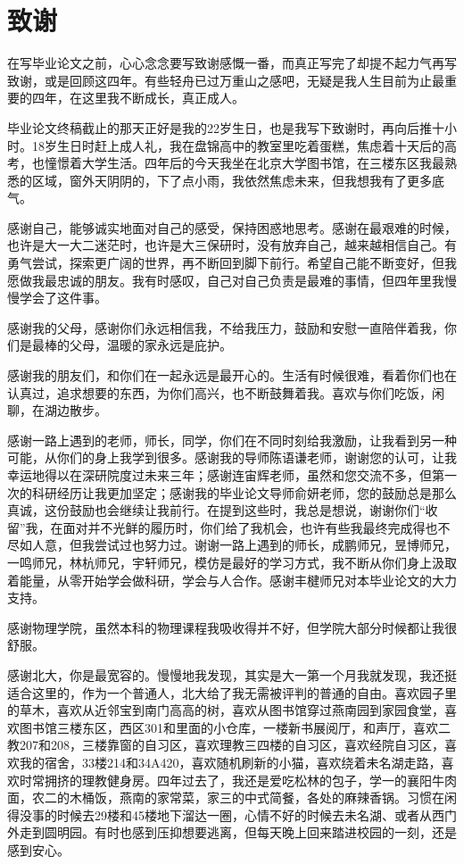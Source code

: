 \chapter{致谢}
在写毕业论文之前，心心念念要写致谢感慨一番，而真正写完了却提不起力气再写致谢，或是回顾这四年。有些轻舟已过万重山之感吧，无疑是我人生目前为止最重要的四年，在这里我不断成长，真正成人。

毕业论文终稿截止的那天正好是我的22岁生日，也是我写下致谢时，再向后推十小时。18岁生日时赶上成人礼，我在盘锦高中的教室里吃着蛋糕，焦虑着十天后的高考，也憧憬着大学生活。四年后的今天我坐在北京大学图书馆，在三楼东区我最熟悉的区域，窗外天阴阴的，下了点小雨，我依然焦虑未来，但我想我有了更多底气。

感谢自己，能够诚实地面对自己的感受，保持困惑地思考。感谢在最艰难的时候，也许是大一大二迷茫时，也许是大三保研时，没有放弃自己，越来越相信自己。有勇气尝试，探索更广阔的世界，再不断回到脚下前行。希望自己能不断变好，但我愿做我最忠诚的朋友。我有时感叹，自己对自己负责是最难的事情，但四年里我慢慢学会了这件事。

感谢我的父母，感谢你们永远相信我，不给我压力，鼓励和安慰一直陪伴着我，你们是最棒的父母，温暖的家永远是庇护。

感谢我的朋友们，和你们在一起永远是最开心的。生活有时候很难，看着你们也在认真过，追求想要的东西，为你们高兴，也不断鼓舞着我。喜欢与你们吃饭，闲聊，在湖边散步。

感谢一路上遇到的老师，师长，同学，你们在不同时刻给我激励，让我看到另一种可能，从你们的身上我学到很多。感谢我的导师陈语谦老师，谢谢您的认可，让我幸运地得以在深研院度过未来三年；感谢连宙辉老师，虽然和您交流不多，但第一次的科研经历让我更加坚定；感谢我的毕业论文导师俞妍老师，您的鼓励总是那么真诚，这份鼓励也会继续让我前行。在提到这些时，我总是想说，谢谢你们“收留”我，在面对并不光鲜的履历时，你们给了我机会，也许有些我最终完成得也不尽如人意，但我尝试过也努力过。谢谢一路上遇到的师长，成鹏师兄，昱博师兄，一鸣师兄，林杭师兄，宇轩师兄，模仿是最好的学习方式，我不断从你们身上汲取着能量，从零开始学会做科研，学会与人合作。感谢丰楗师兄对本毕业论文的大力支持。

感谢物理学院，虽然本科的物理课程我吸收得并不好，但学院大部分时候都让我很舒服。

感谢北大，你是最宽容的。慢慢地我发现，其实是大一第一个月我就发现，我还挺适合这里的，作为一个普通人，北大给了我无需被评判的普通的自由。喜欢园子里的草木，喜欢从近邻宝到南门高高的树，喜欢从图书馆穿过燕南园到家园食堂，喜欢图书馆三楼东区，西区301和里面的小仓库，一楼新书展阅厅，和声厅，喜欢二教207和208，三楼靠窗的自习区，喜欢理教三四楼的自习区，喜欢经院自习区，喜欢我的宿舍，33楼214和34A420，喜欢随机刷新的小猫，喜欢绕着未名湖走路，喜欢时常拥挤的理教健身房。四年过去了，我还是爱吃松林的包子，学一的襄阳牛肉面，农二的木桶饭，燕南的家常菜，家三的中式简餐，各处的麻辣香锅。习惯在闲得没事的时候去29楼和45楼地下溜达一圈，心情不好的时候去未名湖、或者从西门外走到圆明园。有时也感到压抑想要逃离，但每天晚上回来踏进校园的一刻，还是感到安心。

